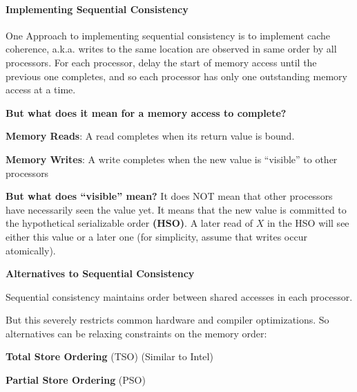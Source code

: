 \paragraph{Implementing Sequential Consistency} One Approach to implementing sequential consistency is to implement cache coherence, a.k.a. writes to the same location are observed in same order by all processors. For each processor, delay the start of memory access until the previous one completes, and so each processor has only one outstanding memory access at a time.
\par \textbf{But what does it mean for a memory access to complete?}
\par \textbf{Memory Reads}: A read completes when its return value is bound.
\par \textbf{Memory Writes}: A write completes when the new value is “visible” to other processors
\par \textbf{But what does \enquote{visible} mean?} It does NOT mean that other processors have necessarily seen the value yet. It means that the new value is committed to the hypothetical serializable order \textbf{(HSO)}. A later read of $X$ in the HSO will see either this value or a later one (for simplicity, assume that writes occur atomically).
\par {\large \textbf{Alternatives to Sequential Consistency}}
\par Sequential consistency maintains order between shared accesses in each processor.
\par But this severely restricts common hardware and compiler optimizations. So alternatives can be relaxing constraints on the memory order:\\
\hfill\vrule\hfill
{}%
\begin{multicols}{2}
    \par \textbf{Total Store Ordering} (TSO) (Similar to Intel)
    \par \textbf{Partial Store Ordering} (PSO)
\end{multicols}
%
\clearpage
%
